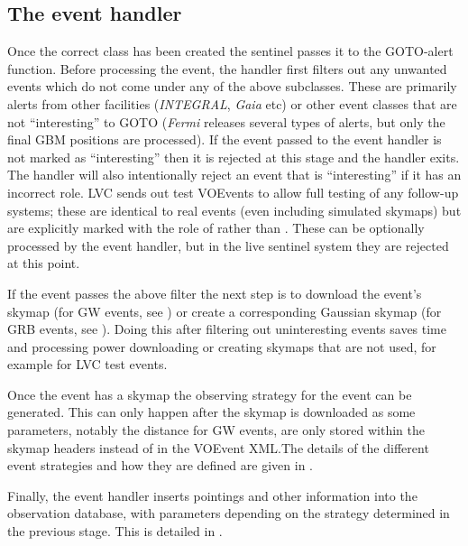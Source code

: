 \subsection{The event handler}
\label{sec:event_handler}
\begin{colsection}

Once the correct  class has been created the sentinel passes it to the GOTO-alert  function. Before processing the event, the handler first filters out any unwanted events which do not come under any of the above subclasses. These are primarily alerts from other facilities (\textit{INTEGRAL}, \textit{Gaia} etc) or other event classes that are not ``interesting'' to GOTO (\textit{Fermi} releases several types of alerts, but only the final GBM positions are processed). If the event passed to the event handler is not marked as ``interesting'' then it is rejected at this stage and the handler exits. The handler will also intentionally reject an event that is ``interesting'' if it has an incorrect role. LVC sends out test VOEvents to allow full testing of any follow-up systems; these are identical to real events (even including simulated skymaps) but are explicitly marked with the role of  rather than . These can be optionally processed by the event handler, but in the live sentinel system they are rejected at this point.

If the event passes the above filter the next step is to download the event's skymap (for GW events, see ) or create a corresponding Gaussian skymap (for GRB events, see ). Doing this after filtering out uninteresting events saves time and processing power downloading or creating skymaps that are not used, for example for LVC test events.

Once the event has a skymap the observing strategy for the event can be generated. This can only happen after the skymap is downloaded as some parameters, notably the distance for GW events, are only stored within the skymap headers instead of in the VOEvent XML.\@ The details of the different event strategies and how they are defined are given in .

Finally, the event handler inserts pointings and other information into the observation database, with parameters depending on the strategy determined in the previous stage. This is detailed in .

\newpage

\end{colsection}

